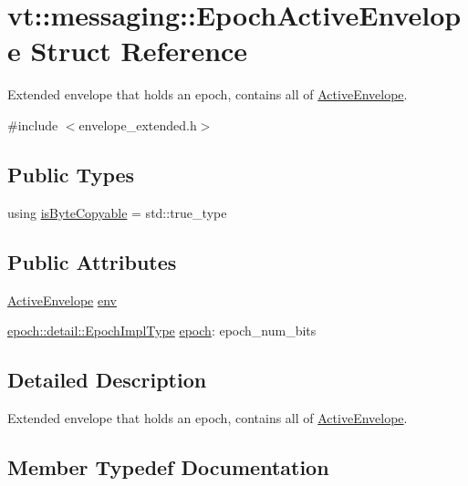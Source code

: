 \hypertarget{structvt_1_1messaging_1_1_epoch_active_envelope}{}\section{vt\+:\+:messaging\+:\+:Epoch\+Active\+Envelope Struct Reference}
\label{structvt_1_1messaging_1_1_epoch_active_envelope}


Extended envelope that holds an epoch, contains all of {\ttfamily \hyperlink{structvt_1_1messaging_1_1_active_envelope}{Active\+Envelope}}.  




{\ttfamily \#include $<$envelope\+\_\+extended.\+h$>$}

\subsection*{Public Types}
\begin{DoxyCompactItemize}
\item 
using \hyperlink{structvt_1_1messaging_1_1_epoch_active_envelope_acc191b9182733db346b508d4c77c2e58}{is\+Byte\+Copyable} = std\+::true\+\_\+type
\end{DoxyCompactItemize}
\subsection*{Public Attributes}
\begin{DoxyCompactItemize}
\item 
\hyperlink{structvt_1_1messaging_1_1_active_envelope}{Active\+Envelope} \hyperlink{structvt_1_1messaging_1_1_epoch_active_envelope_aba54092b517b6ade61d737d78aed8d3e}{env}
\item 
\hyperlink{namespacevt_1_1epoch_1_1detail_a9adc5df96a521e516dc20511eb553075}{epoch\+::detail\+::\+Epoch\+Impl\+Type} \hyperlink{structvt_1_1messaging_1_1_epoch_active_envelope_a1859d12e89072e39caba3615df85cada}{epoch}\+: epoch\+\_\+num\+\_\+bits
\end{DoxyCompactItemize}


\subsection{Detailed Description}
Extended envelope that holds an epoch, contains all of {\ttfamily \hyperlink{structvt_1_1messaging_1_1_active_envelope}{Active\+Envelope}}. 

\subsection{Member Typedef Documentation}
\mbox{\label{structvt_1_1messaging_1_1_epoch_active_envelope_acc191b9182733db346b508d4c77c2e58}} 
